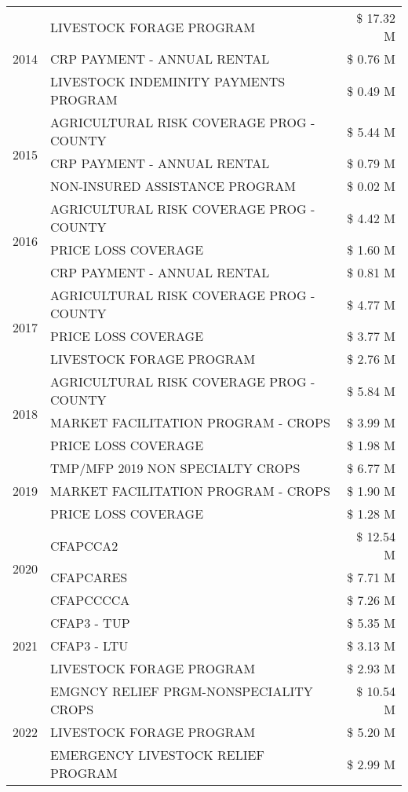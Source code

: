 \begin{tabular}{llr}
\cline{1-3}
\multirow[t]{3}{*}{2014} & LIVESTOCK FORAGE PROGRAM & \$ 17.32 M \\
 & CRP PAYMENT - ANNUAL RENTAL & \$ 0.76 M \\
 & LIVESTOCK INDEMINITY PAYMENTS PROGRAM & \$ 0.49 M \\
\cline{1-3}
\multirow[t]{3}{*}{2015} & AGRICULTURAL RISK COVERAGE PROG - COUNTY & \$ 5.44 M \\
 & CRP PAYMENT - ANNUAL RENTAL & \$ 0.79 M \\
 & NON-INSURED ASSISTANCE PROGRAM & \$ 0.02 M \\
\cline{1-3}
\multirow[t]{3}{*}{2016} & AGRICULTURAL RISK COVERAGE PROG - COUNTY & \$ 4.42 M \\
 & PRICE LOSS COVERAGE & \$ 1.60 M \\
 & CRP PAYMENT - ANNUAL RENTAL & \$ 0.81 M \\
\cline{1-3}
\multirow[t]{3}{*}{2017} & AGRICULTURAL RISK COVERAGE PROG - COUNTY & \$ 4.77 M \\
 & PRICE LOSS COVERAGE & \$ 3.77 M \\
 & LIVESTOCK FORAGE PROGRAM & \$ 2.76 M \\
\cline{1-3}
\multirow[t]{3}{*}{2018} & AGRICULTURAL RISK COVERAGE PROG - COUNTY & \$ 5.84 M \\
 & MARKET FACILITATION PROGRAM - CROPS & \$ 3.99 M \\
 & PRICE LOSS COVERAGE & \$ 1.98 M \\
\cline{1-3}
\multirow[t]{3}{*}{2019} & TMP/MFP 2019 NON SPECIALTY CROPS & \$ 6.77 M \\
 & MARKET FACILITATION PROGRAM - CROPS & \$ 1.90 M \\
 & PRICE LOSS COVERAGE & \$ 1.28 M \\
\cline{1-3}
\multirow[t]{3}{*}{2020} & CFAPCCA2 & \$ 12.54 M \\
 & CFAPCARES & \$ 7.71 M \\
 & CFAPCCCCA & \$ 7.26 M \\
\cline{1-3}
\multirow[t]{3}{*}{2021} & CFAP3 - TUP & \$ 5.35 M \\
 & CFAP3 - LTU & \$ 3.13 M \\
 & LIVESTOCK FORAGE PROGRAM & \$ 2.93 M \\
\cline{1-3}
\multirow[t]{3}{*}{2022} & EMGNCY RELIEF PRGM-NONSPECIALITY CROPS & \$ 10.54 M \\
 & LIVESTOCK FORAGE PROGRAM & \$ 5.20 M \\
 & EMERGENCY LIVESTOCK RELIEF PROGRAM & \$ 2.99 M \\
\cline{1-3}
\bottomrule
\end{tabular}
